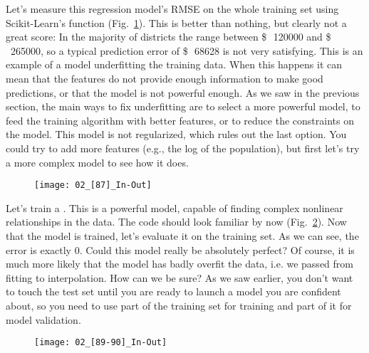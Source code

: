 Let's measure this regression model's RMSE on the whole training set using Scikit-Learn's  function (Fig.~\ref{02_[87]_In-Out}). This is better than nothing, but clearly not a great score: In the majority of districts the  range between \SI{120000}[\$\,]{} and \SI{265000}[\$\,]{}, so a typical prediction error of \SI{68628}[\$\,]{} is not very satisfying. This is an example of a model underfitting the training data. When this happens it can mean that the features do not provide enough information to make good predictions, or that the model is not powerful enough. As we saw in the previous section, the main ways to fix underfitting are to select a more powerful model, to feed the training algorithm with better features, or to reduce the constraints on the model. This model is not regularized, which rules out the last option. You could try to add more features (e.g., the log of the population), but first let's try a more complex model to see how it does.
\begin{figure}[h!t]
\centering
\texttt{[image: 02\_[87]\_In-Out]}
\caption{}\label{02_[87]_In-Out}
\end{figure}

Let's train a . This is a powerful model, capable of finding complex nonlinear relationships in the data. The code should look familiar by now (Fig.~\ref{02_[89-90]_In-Out}). Now that the model is trained, let's evaluate it on the training set. As we can see, the error is exactly 0. Could this model really be absolutely perfect? Of course, it is much more likely that the model has badly overfit the data, i.e. we passed from fitting to interpolation. How can we be sure? As we saw earlier, you don't want to touch the test set until you are ready to launch a model you are confident about, so you need to use part of the training set for training and part of it for model validation.
\begin{figure}[h!t]
\centering
\texttt{[image: 02\_[89-90]\_In-Out]}
\caption{}\label{02_[89-90]_In-Out}
\end{figure}
